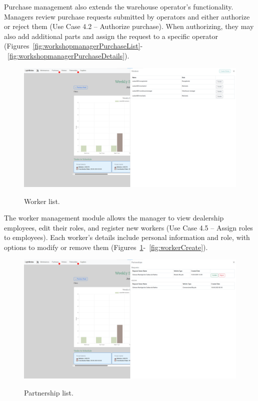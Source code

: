 Purchase management also extends the warehouse operator's functionality. Managers review purchase requests submitted by operators and either authorize or reject them (Use Case 4.2 – Authorize purchase). When authorizing, they may also add additional parts and assign the request to a specific operator (Figures~\ref{fig:workshopmanagerPurchaseList}-~\ref{fig:workshopmanagerPurchaseDetails}).


\begin{figure}[h]
  \caption{Worker list.}
  \centering
  \includegraphics[width=\textwidth]{figs/Implementation/workshopmanager/workerList}
  \label{fig:workerList}
\end{figure}




The worker management module allows the manager to view dealership employees, edit their roles, and register new workers (Use Case 4.5 – Assign roles to employees). Each worker's details include personal information and role, with options to modify or remove them (Figures~\ref{fig:workerList}-~\ref{fig:workerCreate}).


\begin{figure}[h]
  \caption{Partnership list.}
  \centering
  \includegraphics[width=\textwidth]{figs/Implementation/workshopmanager/partnershipList}
  \label{fig:partnershipList}
\end{figure}


